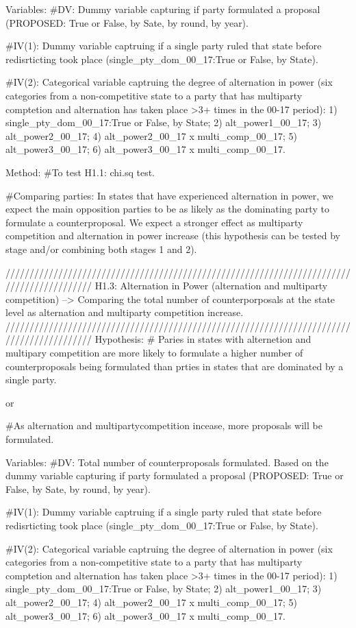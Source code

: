 \documentclass[]{article}
\begin{document}
Variables: \#DV: Dummy variable capturing if party formulated a proposal
(PROPOSED: True or False, by Sate, by round, by year).

\#IV(1): Dummy variable captruing if a single party ruled that state
before redisrticting took place (single\_pty\_dom\_00\_17:True or False,
by State).

\#IV(2): Categorical variable captruing the degree of alternation in
power (six categories from a non-competitive state to a party that has
multiparty comptetion and alternation has taken place \textgreater{}3+
times in the 00-17 period): 1) single\_pty\_dom\_00\_17:True or False,
by State; 2) alt\_power1\_00\_17; 3) alt\_power2\_00\_17; 4)
alt\_power2\_00\_17 x multi\_comp\_00\_17; 5) alt\_power3\_00\_17; 6)
alt\_power3\_00\_17 x multi\_comp\_00\_17.

Method: \#To test H1.1: chi.sq test.

\#Comparing parties: In states that have experienced alternation in
power, we expect the main opposition parties to be as likely as the
dominating party to formulate a counterproposal. We expect a stronger
effect as multiparty competition and alternation in power increase (this
hypothesis can be tested by stage and/or combining both stages 1 and 2).

//////////////////////////////////////////////////////////////////////////////////////////
H1.3: Alternation in Power (alternation and multiparty competition)
--\textgreater{} Comparing the total number of counterporposals at the
state level as alternation and multiparty competition increase.
//////////////////////////////////////////////////////////////////////////////////////////
Hypothesis: \# Paries in states with alternetion and multipary
competition are more likely to formulate a higher number of
counterproposals being formulated than prties in states that are
dominated by a single party.

or

\#As alternation and multipartycompetition incease, more proposals will
be formulated.

Variables: \#DV: Total number of counterproposals formulated. Based on
the dummy variable capturing if party formulated a proposal (PROPOSED:
True or False, by Sate, by round, by year).

\#IV(1): Dummy variable captruing if a single party ruled that state
before redisrticting took place (single\_pty\_dom\_00\_17:True or False,
by State).

\#IV(2): Categorical variable captruing the degree of alternation in
power (six categories from a non-competitive state to a party that has
multiparty comptetion and alternation has taken place \textgreater{}3+
times in the 00-17 period): 1) single\_pty\_dom\_00\_17:True or False,
by State; 2) alt\_power1\_00\_17; 3) alt\_power2\_00\_17; 4)
alt\_power2\_00\_17 x multi\_comp\_00\_17; 5) alt\_power3\_00\_17; 6)
alt\_power3\_00\_17 x multi\_comp\_00\_17.
\end{document}
